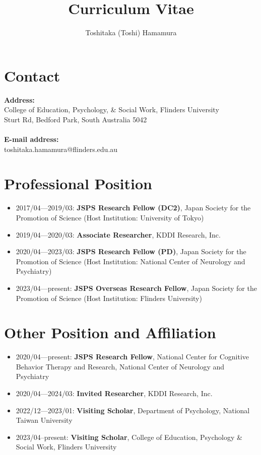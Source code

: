 \documentclass[a4paper]{article}
\begin{document}
\sloppy
\title{Curriculum Vitae}
\author{Toshitaka (Toshi) Hamamura}
\maketitle

\section{Contact}
\textbf{Address:}\\
College of Education, Psychology, \& Social Work, Flinders University\\
Sturt Rd, Bedford Park, South Australia 5042\\
\\
\textbf{E-mail address:}\\	
toshitaka.hamamura@flinders.edu.au

\section{Professional Position}
\begin{itemize}
	\item 2017/04---2019/03: \textbf{JSPS Research Fellow (DC2)}, Japan Society for the Promotion of Science (Host Institution: University of Tokyo)
	\item 2019/04---2020/03: \textbf{Associate Researcher}, KDDI Research, Inc.
	\item 2020/04---2023/03: \textbf{JSPS Research Fellow (PD)}, Japan Society for the Promotion of Science (Host Institution: National Center of Neurology and Psychiatry)
	\item 2023/04---present: \textbf{JSPS Overseas Research Fellow}, Japan Society for the Promotion of Science (Host Institution: Flinders University)
\end{itemize}

\section{Other Position and Affiliation}
\begin{itemize}
	\item 2020/04---present: \textbf{JSPS Research Fellow}, National Center for Cognitive Behavior Therapy and Research, National Center of Neurology and Psychiatry
	\item 2020/04---2024/03: \textbf{Invited Researcher}, KDDI Research, Inc.
	\item 2022/12---2023/01: \textbf{Visiting Scholar}, Department of Psychology, National Taiwan University
	\item 2023/04--present: \textbf{Visiting Scholar}, College of Education, Psychology \& Social Work, Flinders University
\end{itemize}
\end{document}
